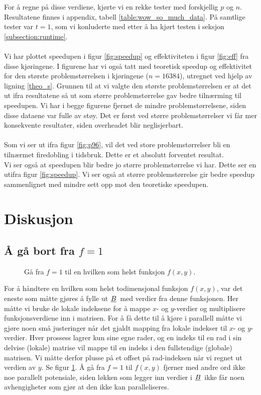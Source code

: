 \documentclass{article}
\newcommand{\ub}[1]{\underbar{$#1$}\,}
\begin{document}
For å regne på disse verdiene, kjørte vi en rekke tester med forskjellig $p$ og $n$. Resultatene finnes i appendix, tabell \ref{table:wow_so_much_data}. På samtlige tester var $t=1$, som vi konluderte med etter å ha kjørt testen i seksjon \ref{subsection:runtime}.\\
\\
Vi har plottet speedupen i figur \ref{fig:speedup} og effektiviteten i figur \ref{fig:eff} fra disse kjøringene. I figurene har vi også tatt med teoretisk speedup og effektivitet for den største problemstørrelsen i kjøringene ($n = 16384$), utregnet ved hjelp av ligning \ref{theo_s}. Grunnen til at vi valgte den største problemstørrelsen er at det ut ifra resultatene så ut som større problemstørrelse gav bedre tilnærming til speedupen. Vi har i begge figurene fjernet de mindre problemstørrelsene, siden disse dataene var fulle av støy. Det er først ved større problemstørrelser vi får mer konsekvente resultater, siden overheadet blir neglisjerbart.\\
\\
Som vi ser ut ifra figur \ref{fig:p96}, vil det ved store problemstørrelser bli en tilnærmet firedobling i tidsbruk. Dette er et absolutt forventet resultat. \\

Vi ser også at speedupen blir bedre jo større problemstørrelse vi har. Dette ser en utifra figur \ref{fig:speedup}. Vi ser også at større problemstørrelse gir bedre speedup sammenlignet med mindre sett opp mot den teoretiske speedupen.  


\section{Diskusjon}


\subsection{Å gå bort fra $f=1$}
\begin{figure}[h]
	\centering
	
	\caption{Gå fra $f=1$ til en hvilken som helst funksjon $f(x, y)$.}
	\label{fig:local_f}
\end{figure}
For å håndtere en hvilken som helst todimensjonal funksjon $f(x, y)$, var det eneste som måtte gjøres å fylle ut $\ub{B}$ med verdier fra denne funksjonen. Her måtte vi bruke de lokale indeksene for å mappe $x$- og $y$-verdier og multiplisere funksjonsverdiene inn i matrisen. For å få dette til å kjøre i parallell måtte vi gjøre noen små justeringer når det gjaldt mapping fra lokale indekser til $x$- og $y$-verdier. Hver prossess lagrer kun sine egne rader, og en indeks til en rad i sin delvise (lokale) matrise vil mappe til en indeks i den fullstendige (globale) matrisen. Vi måtte derfor plusse på et offset på rad-indeksen når vi regnet ut verdien av $y$. Se figur \ref{fig:local_f}. Å gå fra $f=1$ til $f(x, y)$ fjerner med andre ord ikke noe parallelt potensiale, siden løkken som legger inn verdier i $\ub{B}$ ikke får noen avhengigheter som gjør at den ikke kan paralleliseres.
\end{document}
